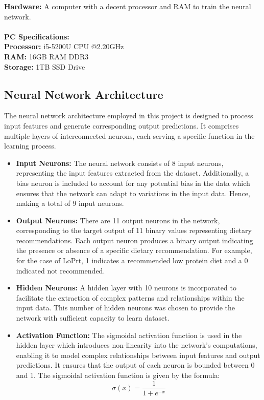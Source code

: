 \noindent\textbf{Hardware:}\newline
A computer with a decent processor and RAM to train the neural network.\\\\
\textbf{PC Specifications:}\\
\textbf{Processor:} i5-5200U CPU @2.20GHz\\
\textbf{RAM:} 16GB RAM DDR3\\
\textbf{Storage:} 1TB SSD Drive\\

\subsection{Neural Network Architecture}
The neural network architecture employed in this project is designed to process input features and generate corresponding output predictions. It comprises multiple layers of interconnected neurons, each serving a specific function in the learning process.

\begin{itemize}
\item \textbf{Input Neurons:} The neural network consists of 8 input neurons, representing the input features extracted from the dataset. Additionally, a bias neuron is included to account for any potential bias in the data which ensures that the network can adapt to variations in the input data. Hence, making a total of 9 input neurons.

\item \textbf{Output Neurons:} There are 11 output neurons in the network, corresponding to the target output of 11 binary values representing dietary recommendations. Each output neuron produces a binary output indicating the presence or absence of a specific dietary recommendation. For example, for the case of LoPrt, 1 indicates a recommended low protein diet and a 0 indicated not recommended.

\item \textbf{Hidden Neurons:} A hidden layer with 10 neurons is incorporated to facilitate the extraction of complex patterns and relationships within the input data. This number of hidden neurons was chosen to provide the network with sufficient capacity to learn dataset.

\item \textbf{Activation Function:} The sigmoidal activation function is used in the hidden layer which introduces non-linearity into the network's computations, enabling it to model complex relationships between input features and output predictions. It ensures that the output of each neuron is bounded between 0 and 1. The sigmoidal activation function is given by the formula:
\begin{equation}
    \sigma(x) = \frac{1}{1 + e^{-x}}
\end{equation}
\end{itemize}

